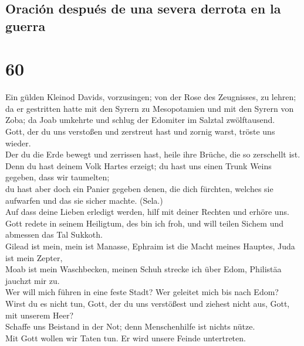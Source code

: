 \hypertarget{oraciuxf3n-despuuxe9s-de-una-severa-derrota-en-la-guerra}{%
\subsection{Oración después de una severa derrota en la
guerra}\label{oraciuxf3n-despuuxe9s-de-una-severa-derrota-en-la-guerra}}

\hypertarget{section-59}{%
\section{60}\label{section-59}}

 Ein gülden Kleinod Davids, vorzusingen; von der Rose des
Zeugnisses, zu lehren;\\
 da er gestritten hatte mit den Syrern zu Mesopotamien und
mit den Syrern von Zoba; da Joab umkehrte und schlug der Edomiter im
Salztal zwölftausend.\\
 Gott, der du uns verstoßen und zerstreut hast und zornig
warst, tröste uns wieder.\\
 Der du die Erde bewegt und zerrissen hast, heile ihre
Brüche, die so zerschellt ist.\\
 Denn du hast deinem Volk Hartes erzeigt; du hast uns
einen Trunk Weins gegeben, dass wir taumelten;\\
 du hast aber doch ein Panier gegeben denen, die dich
fürchten, welches sie aufwarfen und das sie sicher machte. (Sela.)\\
 Auf dass deine Lieben erledigt werden, hilf mit deiner
Rechten und erhöre uns.\\
 Gott redete in seinem Heiligtum, des bin ich froh, und
will teilen Sichem und abmessen das Tal Sukkoth.\\
 Gilead ist mein, mein ist Manasse, Ephraim ist die Macht
meines Hauptes, Juda ist mein Zepter,\\
 Moab ist mein Waschbecken, meinen Schuh strecke ich über
Edom, Philistäa jauchzt mir zu.\\
 Wer will mich führen in eine feste Stadt? Wer geleitet
mich bis nach Edom?\\
 Wirst du es nicht tun, Gott, der du uns verstößest und
ziehest nicht aus, Gott, mit unserem Heer?\\
 Schaffe uns Beistand in der Not; denn Menschenhilfe ist
nichts nütze.\\
 Mit Gott wollen wir Taten tun. Er wird unsere Feinde
untertreten.

